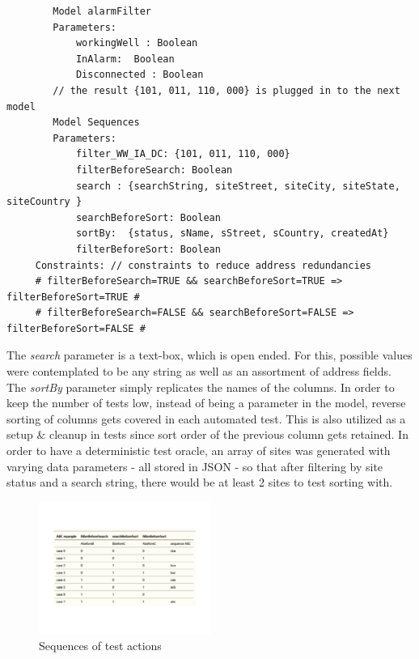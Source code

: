 \documentclass[conference]{IEEEtran}
\begin{document}
	\begin{lstlisting}
		Model alarmFilter
	 	Parameters:
			workingWell : Boolean
			InAlarm:  Boolean
			Disconnected : Boolean
		// the result {101, 011, 110, 000} is plugged in to the next model 	
		Model Sequences
		Parameters:
			filter_WW_IA_DC: {101, 011, 110, 000}
			filterBeforeSearch: Boolean
			search : {searchString, siteStreet, siteCity, siteState, siteCountry }
			searchBeforeSort: Boolean
			sortBy:  {status, sName, sStreet, sCountry, createdAt}
			filterBeforeSort: Boolean
	 Constraints: // constraints to reduce address redundancies
	 # filterBeforeSearch=TRUE && searchBeforeSort=TRUE => filterBeforeSort=TRUE #
	 # filterBeforeSearch=FALSE && searchBeforeSort=FALSE => filterBeforeSort=FALSE #
	\end{lstlisting}

	The \textit{search} parameter is a text-box, which is open ended. For this, possible values were contemplated to be any string as well as an assortment of address fields.
	The \textit{sortBy} parameter simply replicates the names of the columns. 
	In order to keep the number of tests low, instead of being a parameter in the model, reverse sorting of columns gets covered in each automated test.
	This is also utilized as a setup \& cleanup in tests since sort order of the previous column gets retained.
	In order to have a deterministic test oracle, an array of sites was generated with varying data parameters - all stored in JSON - so that after filtering by site status and a search string, there would be at least 2 sites to test sorting with.
	
	\begin{figure}[!t]
		\includegraphics[width=0.50\textwidth,]{sorting.pdf}
		\caption{Sequences of test actions}
		\label{fig:sorting}
	\end{figure}
		
\end{document}
